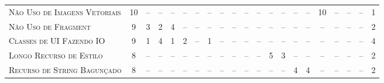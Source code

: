 \begin{table*}
\begin{tabular}{@{}p{3.5cm}p{0.3cm}p{.2cm}p{.2cm}p{.2cm}p{.2cm}p{.2cm}p{.2cm}p{.2cm}p{.2cm}p{.2cm}p{.4cm}p{.4cm}p{.4cm}p{.4cm}p{.4cm}p{.4cm}p{.4cm}p{.4cm}p{.4cm}p{0.2cm}@{}}
\textsc{Não Uso de Imagens Vetoriais}      	& \multicolumn{1}{c}{10} 	& \multicolumn{1}{c}{--} 	& \multicolumn{1}{c}{--} 	& \multicolumn{1}{c}{--} 	& \multicolumn{1}{c}{--} 	& \multicolumn{1}{c}{--} 	& \multicolumn{1}{c}{--} 	& \multicolumn{1}{c}{--} 	& \multicolumn{1}{c}{--} 	& \multicolumn{1}{c}{--} 	& \multicolumn{1}{c}{--} 	& \multicolumn{1}{c}{--} 	& \multicolumn{1}{c}{--} 	& \multicolumn{1}{c}{--} 	& \multicolumn{1}{c}{--} 	& \multicolumn{1}{c}{10}	& \multicolumn{1}{c}{--} 	& \multicolumn{1}{c}{--} 	& \multicolumn{1}{c}{--} 	& \multicolumn{1}{c}{1} \\
\textsc{Não Uso de Fragment}               	& \multicolumn{1}{c}{9} 	& \multicolumn{1}{c}{3} 	& \multicolumn{1}{c}{2} 	& \multicolumn{1}{c}{4}	 	& \multicolumn{1}{c}{--} 	& \multicolumn{1}{c}{--} 	& \multicolumn{1}{c}{--} 	& \multicolumn{1}{c}{--} 	& \multicolumn{1}{c}{--} 	& \multicolumn{1}{c}{--} 	& \multicolumn{1}{c}{--} 	& \multicolumn{1}{c}{--} 	& \multicolumn{1}{c}{--} 	& \multicolumn{1}{c}{--} 	& \multicolumn{1}{c}{--} 	& \multicolumn{1}{c}{--}	& \multicolumn{1}{c}{--} 	& \multicolumn{1}{c}{--} 	& \multicolumn{1}{c}{--} 	& \multicolumn{1}{c}{2} \\
\textsc{Classes de UI Fazendo IO}          	& \multicolumn{1}{c}{9} 	& \multicolumn{1}{c}{1} 	& \multicolumn{1}{c}{4} 	& \multicolumn{1}{c}{1}	 	& \multicolumn{1}{c}{2} 	& \multicolumn{1}{c}{--} 	& \multicolumn{1}{c}{1} 	& \multicolumn{1}{c}{--} 	& \multicolumn{1}{c}{--} 	& \multicolumn{1}{c}{--} 	& \multicolumn{1}{c}{--} 	& \multicolumn{1}{c}{--} 	& \multicolumn{1}{c}{--} 	& \multicolumn{1}{c}{--} 	& \multicolumn{1}{c}{--} 	& \multicolumn{1}{c}{--}	& \multicolumn{1}{c}{--} 	& \multicolumn{1}{c}{--} 	& \multicolumn{1}{c}{--} 	& \multicolumn{1}{c}{4} \\
\textsc{Longo Recurso de Estilo}           	& \multicolumn{1}{c}{8} 	& \multicolumn{1}{c}{--} 	& \multicolumn{1}{c}{--} 	& \multicolumn{1}{c}{--} 	& \multicolumn{1}{c}{--} 	& \multicolumn{1}{c}{--} 	& \multicolumn{1}{c}{--} 	& \multicolumn{1}{c}{--} 	& \multicolumn{1}{c}{--} 	& \multicolumn{1}{c}{--} 	& \multicolumn{1}{c}{--} 	& \multicolumn{1}{c}{5} 	& \multicolumn{1}{c}{3} 	& \multicolumn{1}{c}{--} 	& \multicolumn{1}{c}{--} 	& \multicolumn{1}{c}{--}	& \multicolumn{1}{c}{--} 	& \multicolumn{1}{c}{--} 	& \multicolumn{1}{c}{--} 	& \multicolumn{1}{c}{2} \\
\textsc{Recurso de String Bagunçado}       	& \multicolumn{1}{c}{8} 	& \multicolumn{1}{c}{--} 	& \multicolumn{1}{c}{--} 	& \multicolumn{1}{c}{--} 	& \multicolumn{1}{c}{--} 	& \multicolumn{1}{c}{--} 	& \multicolumn{1}{c}{--} 	& \multicolumn{1}{c}{--} 	& \multicolumn{1}{c}{--} 	& \multicolumn{1}{c}{--} 	& \multicolumn{1}{c}{--} 	& \multicolumn{1}{c}{--} 	& \multicolumn{1}{c}{--} 	& \multicolumn{1}{c}{4} 	& \multicolumn{1}{c}{4} 	& \multicolumn{1}{c}{--}	& \multicolumn{1}{c}{--} 	& \multicolumn{1}{c}{--} 	& \multicolumn{1}{c}{--} 	& \multicolumn{1}{c}{2} \\

\end{tabular}
\end{table*}
